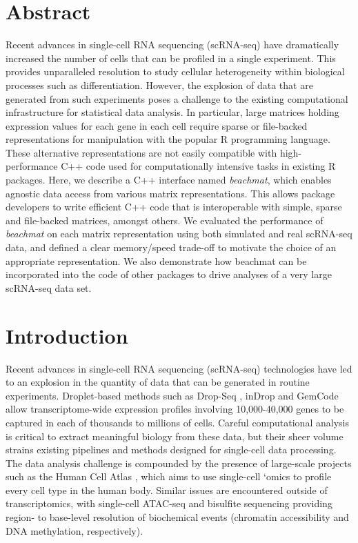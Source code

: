 \documentclass[10pt,letterpaper]{article}
\newcommand{\beachmat}{\textit{beachmat}}
\begin{document}
\section*{Abstract}
Recent advances in single-cell RNA sequencing (scRNA-seq) have dramatically increased the number of cells that can be profiled in a single experiment.
This provides unparalleled resolution to study cellular heterogeneity within biological processes such as differentiation.
However, the explosion of data that are generated from such experiments poses a challenge to the existing computational infrastructure for statistical data analysis.
In particular, large matrices holding expression values for each gene in each cell require sparse or file-backed representations for manipulation with the popular R programming language.
These alternative representations are not easily compatible with high-performance C++ code used for computationally intensive tasks in existing R packages.
Here, we describe a C++ interface named \beachmat{}, which enables agnostic data access from various matrix representations.
This allows package developers to write efficient C++ code that is interoperable with simple, sparse and file-backed matrices, amongst others.
We evaluated the performance of \beachmat{} on each matrix representation using both simulated and real scRNA-seq data, and defined a clear memory/speed trade-off to motivate the choice of an appropriate representation.
We also demonstrate how beachmat can be incorporated into the code of other packages to drive analyses of a very large scRNA-seq data set.

\linenumbers

\section*{Introduction}
Recent advances in single-cell RNA sequencing (scRNA-seq) technologies have led to an explosion in the quantity of data that can be generated in routine experiments.
Droplet-based methods such as Drop-Seq \cite{macosko2015highly}, inDrop \cite{klein2015droplet} and GemCode \cite{zheng2017massively} allow transcriptome-wide expression profiles involving 10,000-40,000 genes to be captured in each of thousands to millions of cells.
Careful computational analysis is critical to extract meaningful biology from these data, but their sheer volume strains existing pipelines and methods designed for single-cell data processing.
The data analysis challenge is compounded by the presence of large-scale projects such as the Human Cell Atlas \cite{regev2017human}, which aims to use single-cell `omics to profile every cell type in the human body.
Similar issues are encountered outside of transcriptomics, with single-cell ATAC-seq \cite{buenrostro2015single} and bisulfite sequencing \cite{smallwood2014single} providing region- to base-level resolution of biochemical events (chromatin accessibility and DNA methylation, respectively).
\end{document}
